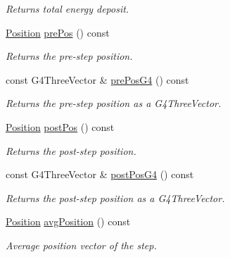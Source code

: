\begin{DoxyCompactItemize}
\begin{DoxyCompactList}\small\item\em Returns total energy deposit. \item\end{DoxyCompactList}\item 
\hyperlink{namespace_d_d4hep_1_1_simulation_ad6fd94b3439e31d1ba4b2e640d578558}{Position} \hyperlink{class_d_d4hep_1_1_simulation_1_1_geant4_step_handler_aaa60daae1bdca84d9dee8e7eb4585f75}{prePos} () const 
\begin{DoxyCompactList}\small\item\em Returns the pre-\/step position. \item\end{DoxyCompactList}\item 
const G4ThreeVector \& \hyperlink{class_d_d4hep_1_1_simulation_1_1_geant4_step_handler_a1cecfe16026e80f0b803b3d113b8e535}{prePosG4} () const 
\begin{DoxyCompactList}\small\item\em Returns the pre-\/step position as a G4ThreeVector. \item\end{DoxyCompactList}\item 
\hyperlink{namespace_d_d4hep_1_1_simulation_ad6fd94b3439e31d1ba4b2e640d578558}{Position} \hyperlink{class_d_d4hep_1_1_simulation_1_1_geant4_step_handler_a93fb68b4ef3a4172a19b483d77d87b01}{postPos} () const 
\begin{DoxyCompactList}\small\item\em Returns the post-\/step position. \item\end{DoxyCompactList}\item 
const G4ThreeVector \& \hyperlink{class_d_d4hep_1_1_simulation_1_1_geant4_step_handler_a41cd79af212c7cab9d2bb5a9d070bf0f}{postPosG4} () const 
\begin{DoxyCompactList}\small\item\em Returns the post-\/step position as a G4ThreeVector. \item\end{DoxyCompactList}\item 
\hyperlink{namespace_d_d4hep_1_1_simulation_ad6fd94b3439e31d1ba4b2e640d578558}{Position} \hyperlink{class_d_d4hep_1_1_simulation_1_1_geant4_step_handler_a4d4f10349d7e13492f237f88c9b47fc3}{avgPosition} () const 
\begin{DoxyCompactList}\small\item\em Average position vector of the step. \item\end{DoxyCompactList}\item 

\end{DoxyCompactItemize}
